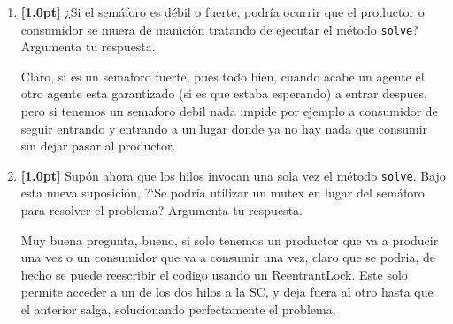 \documentclass[a4paper,11pt]{article}
\begin{document}
\begin{enumerate}
{\begin{enumerate}
\begin{tcblisting}{listing engine=minted,minted language=Java,listing only}
{                            public void solve(final boolean isConsumer) {
                                mutex.adquire();
                                
                                if (isConsumer) {
                                    ... // consume code
                                }
                                else {
                                    ... // producer code
                                }

                                mutex.release();
                            }
                        }
                    \end{tcblisting}

                \item
                    \textbf{[1.0pt]} 
                    ¿Si el semáforo es débil o fuerte, podría ocurrir que el productor o consumidor 
                    se muera de inanición tratando de ejecutar el método \verb|solve|? Argumenta tu respuesta.

                    Claro, si es un semaforo fuerte, pues todo bien, cuando acabe un agente el otro agente esta garantizado
                    (si es que estaba esperando) a entrar despues, pero si tenemos un semaforo debil nada impide por ejemplo
                    a consumidor de seguir entrando y entrando a un lugar donde ya no hay nada que consumir sin dejar pasar
                    al productor.

                \item
                    \textbf{[1.0pt]} Supón ahora que los hilos invocan una sola vez el 
                    método \verb|solve|. Bajo esta nueva suposición, ?`Se podría utilizar un mutex en 
                    lugar del semáforo para resolver el problema? Argumenta tu respuesta.

                    Muy buena pregunta, bueno, si solo tenemos un productor que va a producir una vez o un consumidor que va a consumir
                    una vez, claro que se podria, de hecho se puede reescribir el codigo usando un ReentrantLock. Este solo permite 
                    acceder a un de los dos hilos a la SC, y deja fuera al otro hasta que el anterior salga, solucionando perfectamente
                    el problema.
                
            \end{enumerate}
        }


\end{enumerate}
\end{document}

